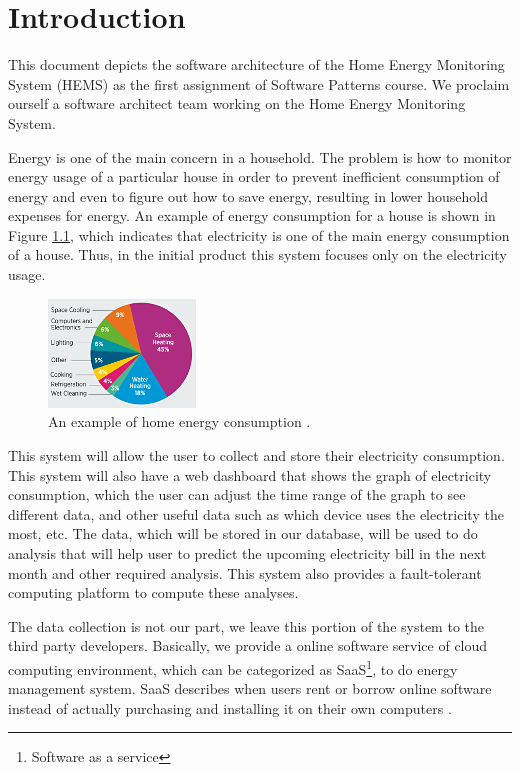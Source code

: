 \chapter{Introduction}
\label{ch:context}
This document depicts the software architecture of the Home Energy Monitoring System (HEMS) as the first assignment of Software Patterns course. We proclaim ourself a software architect team working on the Home Energy Monitoring System.

Energy is one of the main concern in a household. The problem is how to monitor energy usage of a particular house in order to prevent inefficient consumption of energy and even to figure out how to save energy, resulting in lower household expenses for energy. An example of energy consumption for a house is shown in Figure \ref{fig:home-energy-consumption}, which indicates that electricity is one of the main energy consumption of a house. Thus, in the initial product this system focuses only on the electricity usage.

\begin{figure}[!ht]
	\centering
	\includegraphics[width=0.35\textwidth]{1-context/images/energysaver_energyuse.png}
	\caption{An example of home energy consumption \cite{greenifynow}.}
	\label{fig:home-energy-consumption}
\end{figure}

This system will allow the user to collect and store their electricity consumption. This system will also have a web dashboard that shows the graph of electricity consumption, which the user can adjust the time range of the graph to see different data, and other useful data such as which device uses the electricity the most, etc. The data, which will be stored in our database, will be used to do analysis that will help user to predict the upcoming electricity bill in the next month and other required analysis. This system also provides a fault-tolerant computing platform to compute these analyses.

The data collection is not our part, we leave this portion of the system to the third party developers. Basically, we provide a online software service of cloud computing environment, which can be categorized as SaaS\footnote{Software as a service}, to do energy management system. SaaS describes when users rent or borrow online software instead of actually purchasing and installing it on their own computers \cite{whatissaas}.


